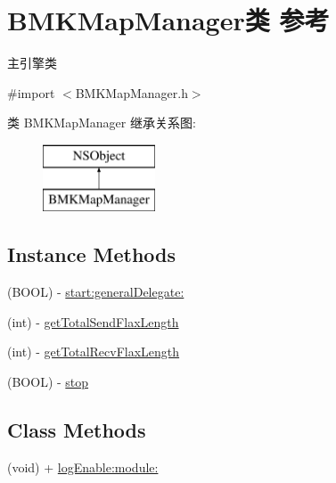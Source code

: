 \hypertarget{interface_b_m_k_map_manager}{}\section{B\+M\+K\+Map\+Manager类 参考}
\label{interface_b_m_k_map_manager}


主引擎类  




{\ttfamily \#import $<$B\+M\+K\+Map\+Manager.\+h$>$}

类 B\+M\+K\+Map\+Manager 继承关系图\+:\begin{figure}[H]
\begin{center}
\leavevmode
\includegraphics[height=2.000000cm]{interface_b_m_k_map_manager}
\end{center}
\end{figure}
\subsection*{Instance Methods}
\begin{DoxyCompactItemize}
\item 
(B\+O\+O\+L) -\/ \hyperlink{interface_b_m_k_map_manager_a95edf9c8fea4c61a79098641c4e9a50f}{start\+:general\+Delegate\+:}
\item 
(int) -\/ \hyperlink{interface_b_m_k_map_manager_a32730c8339c99d79243e13ba2acee3c3}{get\+Total\+Send\+Flax\+Length}
\item 
(int) -\/ \hyperlink{interface_b_m_k_map_manager_a57fcea9612cd09bf8b94bb9e06c7332e}{get\+Total\+Recv\+Flax\+Length}
\item 
(B\+O\+O\+L) -\/ \hyperlink{interface_b_m_k_map_manager_ac53850202f5017ff35c8933c171be0f1}{stop}
\end{DoxyCompactItemize}
\subsection*{Class Methods}
\begin{DoxyCompactItemize}
\item 
(void) + \hyperlink{interface_b_m_k_map_manager_a3eedc38582f3f34c4a6f464a291472de}{log\+Enable\+:module\+:}
\end{DoxyCompactItemize}


